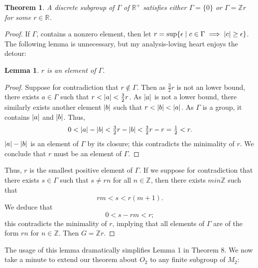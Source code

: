 \documentclass[11pt]{article}
\newtheorem{theorem}{Theorem}
\newtheorem{lemma}{Lemma}
\begin{document}
\begin{adjustwidth}{1cm}{}
	\begin{theorem}
		A discrete subgroup of $\Gamma$ of $\mathbb{R}^{+}$ satisfies either $\Gamma = \{ 0 \}$ or $\Gamma = \mathbb{Z}r$ for some $r \in \mathbb{R}$.
	\end{theorem}
	\begin{proof}
		If $\Gamma$, contains a nonzero element, then let $r = \sup \{ \epsilon \mid c \in \Gamma \implies \abs{c} \ge \epsilon \}$. The following lemma is unnecessary, but my analysis-loving heart enjoys the detour:
		\newpage
		\begin{adjustwidth}{1cm}{}
			\begin{lemma}
				$r$ is an element of $\Gamma$.
			\end{lemma}
			\begin{proof}\renewcommand{\qedsymbol}{}
				Suppose for contradiction that $r \notin \Gamma$. Then as $\tfrac{3}{2}r$ is not an lower bound, there exists $a \in \Gamma$ such that $r < \abs{a} < \tfrac{3}{2} r$. As $\abs{a}$ is not a lower bound, there similarly exists another element $\abs{b}$ such that $r < \abs{b} < \abs{a}$. As $\Gamma$ is a group, it contains $\abs{a}$ and $\abs{b}$. Thus,
				\[
					0 < \abs{a} - \abs{b} < \tfrac{3}{2}r - \abs{b} < \tfrac{3}{2}r - r = \tfrac{1}{2} < r.
				\]
				$\abs{a} - \abs{b}$ is an element of $\Gamma$ by its closure; this contradicts the minimality of $r$. We conclude that $r$ must be an element of $\Gamma$.
			\end{proof}
		\end{adjustwidth}
		Thus, $r$ is the smallest positive element of $\Gamma$. If we suppose for contradiction that there exists $s \in \Gamma$ such that $s \ne rn$ for all $n \in \mathbb{Z}$, then there exists $m in \mathbb{Z}$ such that
		\[
			rm < s < r(m + 1).
		\]
		We deduce that
		\[
			0 < s - rm < r;
		\]
		this contradicts the minimality of $r$, implying that all elements of $\Gamma$ are of the form $rn$ for $n \in \mathbb{Z}$. Then $G = \mathbb{Z}r$.
	\end{proof}
\end{adjustwidth}

The usage of this lemma dramatically simplifies Lemma 1 in Theorem 8. We now take a minute to extend our theorem about $O_{2}$ to any finite subgroup of $M_{2}$:
\end{document}
